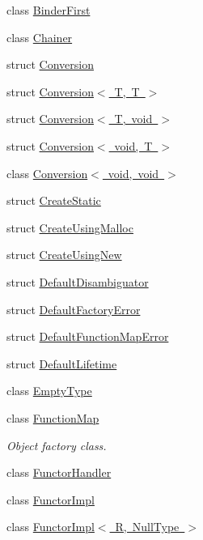 \begin{DoxyCompactItemize}
\item 
class \mbox{\hyperlink{classUtil_1_1BinderFirst}{Binder\+First}}
\item 
class \mbox{\hyperlink{classUtil_1_1Chainer}{Chainer}}
\item 
struct \mbox{\hyperlink{structUtil_1_1Conversion}{Conversion}}
\item 
struct \mbox{\hyperlink{structUtil_1_1Conversion_3_01T_00_01T_01_4}{Conversion$<$ T, T $>$}}
\item 
struct \mbox{\hyperlink{structUtil_1_1Conversion_3_01T_00_01void_01_4}{Conversion$<$ T, void $>$}}
\item 
struct \mbox{\hyperlink{structUtil_1_1Conversion_3_01void_00_01T_01_4}{Conversion$<$ void, T $>$}}
\item 
class \mbox{\hyperlink{classUtil_1_1Conversion_3_01void_00_01void_01_4}{Conversion$<$ void, void $>$}}
\item 
struct \mbox{\hyperlink{structUtil_1_1CreateStatic}{Create\+Static}}
\item 
struct \mbox{\hyperlink{structUtil_1_1CreateUsingMalloc}{Create\+Using\+Malloc}}
\item 
struct \mbox{\hyperlink{structUtil_1_1CreateUsingNew}{Create\+Using\+New}}
\item 
struct \mbox{\hyperlink{structUtil_1_1DefaultDisambiguator}{Default\+Disambiguator}}
\item 
struct \mbox{\hyperlink{structUtil_1_1DefaultFactoryError}{Default\+Factory\+Error}}
\item 
struct \mbox{\hyperlink{structUtil_1_1DefaultFunctionMapError}{Default\+Function\+Map\+Error}}
\item 
struct \mbox{\hyperlink{structUtil_1_1DefaultLifetime}{Default\+Lifetime}}
\item 
class \mbox{\hyperlink{classUtil_1_1EmptyType}{Empty\+Type}}
\item 
class \mbox{\hyperlink{classUtil_1_1FunctionMap}{Function\+Map}}
\begin{DoxyCompactList}\small\item\em Object factory class. \end{DoxyCompactList}\item 
class \mbox{\hyperlink{classUtil_1_1FunctorHandler}{Functor\+Handler}}
\item 
class \mbox{\hyperlink{classUtil_1_1FunctorImpl}{Functor\+Impl}}
\item 
class \mbox{\hyperlink{classUtil_1_1FunctorImpl_3_01R_00_01NullType_01_4}{Functor\+Impl$<$ R, Null\+Type $>$}}

\end{DoxyCompactItemize}
